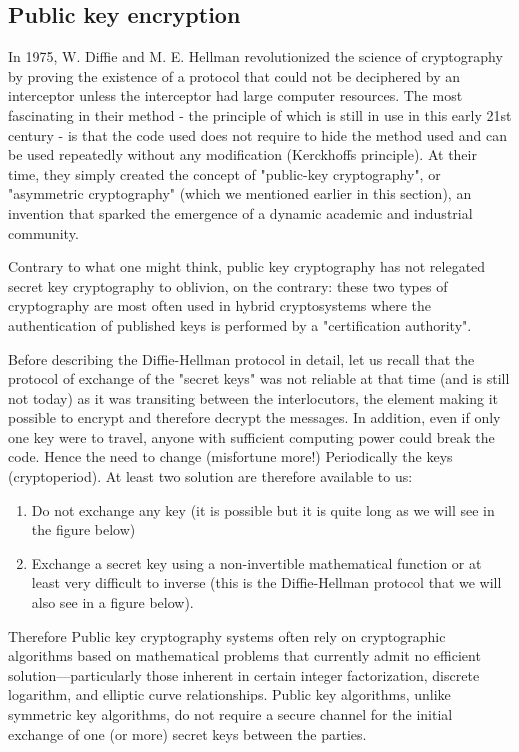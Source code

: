 	\subsection{Public key encryption}
	In 1975, W. Diffie and M. E. Hellman revolutionized the science of cryptography by proving the existence of a protocol that could not be deciphered by an interceptor unless the interceptor had large computer resources. The most fascinating in their method - the principle of which is still in use in this early 21st century - is that the code used does not require to hide the method used and can be used repeatedly without any modification (Kerckhoffs principle). At their time, they simply created the concept of "public-key cryptography", or "asymmetric cryptography" (which we mentioned earlier in this section), an invention that sparked the emergence of a dynamic academic and industrial community.
	\begin{tcolorbox}[title=Remark,colframe=black,arc=10pt]
	Contrary to what one might think, public key cryptography has not relegated secret key cryptography to oblivion, on the contrary: these two types of cryptography are most often used in hybrid cryptosystems where the authentication of published keys is performed by a "certification authority".
	\end{tcolorbox}
	Before describing the Diffie-Hellman protocol  in detail, let us recall that the protocol of exchange of the "secret keys" was not reliable at that time (and is still not today) as it was transiting between the interlocutors, the element making it possible to encrypt and therefore decrypt the messages. In addition, even if only one key were to travel, anyone with sufficient computing power could break the code. Hence the need to change (misfortune more!) Periodically the keys (cryptoperiod). At least two solution are therefore available to us:
	\begin{enumerate}
		\item Do not exchange any key (it is possible but it is quite long as we will see in the figure below)

		\item Exchange a secret key using a non-invertible mathematical function or at least very difficult to inverse (this is the Diffie-Hellman protocol that we will also see in a figure below).
	\end{enumerate}
	Therefore Public key cryptography systems often rely on cryptographic algorithms based on mathematical problems that currently admit no efficient solution—particularly those inherent in certain integer factorization, discrete logarithm, and elliptic curve relationships. Public key algorithms, unlike symmetric key algorithms, do not require a secure channel for the initial exchange of one (or more) secret keys between the parties.

